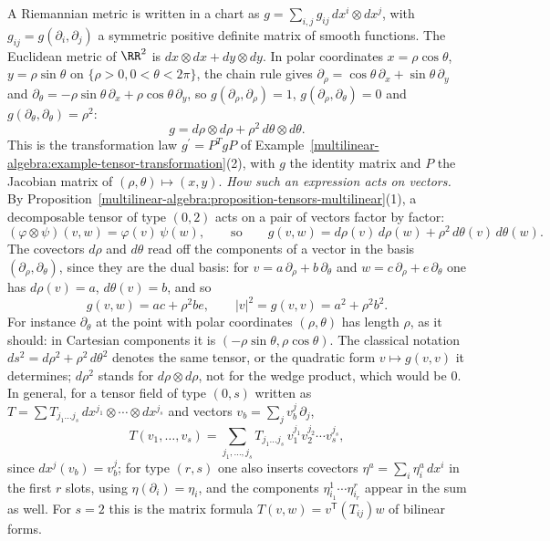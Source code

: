 \begin{example}\label{vector-bundles:example-metric-coordinates}
A Riemannian metric is written in a chart as $g = \sum_{i,j}g_{ij}\,dx^i \otimes dx^j$, with $g_{ij} = g(\partial_i, \partial_j)$ a symmetric positive definite matrix of smooth functions. The
Euclidean metric of $\RR^2$ is $dx \otimes dx + dy \otimes dy$. In polar coordinates $x = \rho\cos\theta$, $y = \rho\sin\theta$ on $\{\rho > 0, 0 < \theta < 2\pi\}$, the chain rule gives
$\partial_\rho = \cos\theta\,\partial_x + \sin\theta\,\partial_y$ and $\partial_\theta = -\rho\sin\theta\,\partial_x + \rho\cos\theta\,\partial_y$, so
$g(\partial_\rho, \partial_\rho) = 1$, $g(\partial_\rho, \partial_\theta) = 0$ and $g(\partial_\theta, \partial_\theta) = \rho^2$:
\[
g = d\rho \otimes d\rho + \rho^2\,d\theta \otimes d\theta .
\]
This is the transformation law $g^{\prime} = P^TgP$ of Example~\ref{multilinear-algebra:example-tensor-transformation}(2), with $g$ the identity matrix and $P$ the Jacobian matrix of
$(\rho, \theta) \mapsto (x, y)$.
\emph{How such an expression acts on vectors.} By Proposition~\ref{multilinear-algebra:proposition-tensors-multilinear}(1), a decomposable tensor of type $(0,2)$ acts on a pair of vectors factor by factor:
\[
(\varphi \otimes \psi)(v, w) = \varphi(v)\,\psi(w), \qquad\text{so}\qquad g(v, w) = d\rho(v)\,d\rho(w) + \rho^2\,d\theta(v)\,d\theta(w).
\]
The covectors $d\rho$ and $d\theta$ read off the components of a vector in the basis $(\partial_\rho, \partial_\theta)$, since they are the dual basis: for $v = a\,\partial_\rho + b\,\partial_\theta$ and
$w = c\,\partial_\rho + e\,\partial_\theta$ one has $d\rho(v) = a$, $d\theta(v) = b$, and so
\[
g(v, w) = ac + \rho^2be, \qquad |v|^2 = g(v, v) = a^2 + \rho^2b^2 .
\]
For instance $\partial_\theta$ at the point with polar coordinates $(\rho, \theta)$ has length $\rho$, as it should: in Cartesian components it is $(-\rho\sin\theta, \rho\cos\theta)$. The classical notation
$ds^2 = d\rho^2 + \rho^2\,d\theta^2$ denotes the same tensor, or the quadratic form $v \mapsto g(v, v)$ it determines; $d\rho^2$ stands for $d\rho \otimes d\rho$, not for the wedge product, which would be $0$.
In general, for a tensor field of type $(0,s)$ written as $T = \sum T_{j_1 \ldots j_s}\,dx^{j_1} \otimes \cdots \otimes dx^{j_s}$ and vectors $v_b = \sum_jv_b^j\,\partial_j$,
\[
T(v_1, \ldots, v_s) = \sum_{j_1, \ldots, j_s}T_{j_1 \ldots j_s}\,v_1^{j_1}v_2^{j_2} \cdots v_s^{j_s},
\]
since $dx^j(v_b) = v_b^j$; for type $(r,s)$ one also inserts covectors $\eta^a = \sum_i\eta^a_i\,dx^i$ in the first $r$ slots, using $\eta(\partial_i) = \eta_i$, and the components $\eta^1_{i_1} \cdots \eta^r_{i_r}$ appear
in the sum as well. For $s = 2$ this is the matrix formula $T(v, w) = v^{\mathsf T}(T_{ij})w$ of bilinear forms.
\end{example}

